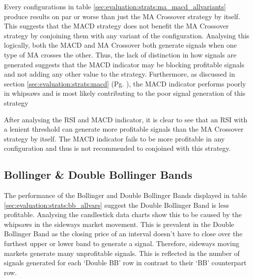 \noindent Every configurations in table \ref{sec:evaluation:strats:ma_macd_allvariants} produce results on par or worse than just the MA Crossover strategy by itself. This suggests that the MACD strategy does not benefit the MA Crossover strategy by conjoining them with any variant of the configuration. Analysing this logically, both the MACD and MA Crossover both generate signals when one type of MA crosses the other. Thus, the lack of distinction in how signals are generated suggests that the MACD indicator may be blocking profitable signals and not adding any other value to the strategy. Furthermore, as discussed in section \ref{sec:evaluation:strats:macd} (Pg. \pageref{sec:evaluation:strats:macd}), the MACD indicator performs poorly in whipsaws and is most likely contributing to the poor signal generation of this strategy

After analysing the RSI and MACD indicator, it is clear to see that an RSI with a lenient threshold can generate more profitable signals than the MA Crossover strategy by itself. The MACD indicator fails to be more profitable in any configuration and thus is not recommended to conjoined with this strategy.

\subsection{Bollinger \& Double Bollinger Bands}
\label{sec:evaluation:strats:bb_double_bb}

\noindent The performance of the Bollinger and Double Bollinger Bands displayed in table \ref{sec:evaluation:strats:bb_allvars} suggest the Double Bollinger Band is less profitable. Analysing the candlestick data charts show this to be caused by the whipsaws in the sideways market movement. This is prevalent in the Double Bollinger Band as the closing price of an interval doesn't have to close over the furthest upper or lower band to generate a signal. Therefore, sideways moving markets generate many unprofitable signals. This is reflected in the number of signals generated for each `Double BB' row in contrast to their `BB' counterpart row.

